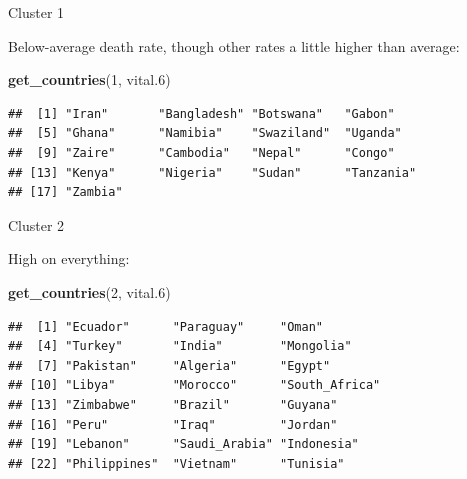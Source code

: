 \documentclass[ignorenonframetext,]{beamer}
\newenvironment{Shaded}{\begin{snugshade}}{\end{snugshade}}
\newcommand{\DecValTok}[1]{\textcolor[rgb]{0.00,0.00,0.81}{#1}}
\newcommand{\FloatTok}[1]{\textcolor[rgb]{0.00,0.00,0.81}{#1}}
\newcommand{\KeywordTok}[1]{\textcolor[rgb]{0.13,0.29,0.53}{\textbf{#1}}}
\newcommand{\NormalTok}[1]{#1}
\begin{document}
\begin{frame}[fragile]{Cluster 1}
\protect\hypertarget{cluster-1-1}{}

Below-average death rate, though other rates a little higher than
average:

\begin{Shaded}
\begin{Highlighting}[]
\KeywordTok{get_countries}\NormalTok{(}\DecValTok{1}\NormalTok{, vital}\FloatTok{.6}\NormalTok{)}
\end{Highlighting}
\end{Shaded}

\begin{verbatim}
##  [1] "Iran"       "Bangladesh" "Botswana"   "Gabon"     
##  [5] "Ghana"      "Namibia"    "Swaziland"  "Uganda"    
##  [9] "Zaire"      "Cambodia"   "Nepal"      "Congo"     
## [13] "Kenya"      "Nigeria"    "Sudan"      "Tanzania"  
## [17] "Zambia"
\end{verbatim}

\end{frame}

\begin{frame}[fragile]{Cluster 2}
\protect\hypertarget{cluster-2}{}

High on everything:

\normalsize

\begin{Shaded}
\begin{Highlighting}[]
\KeywordTok{get_countries}\NormalTok{(}\DecValTok{2}\NormalTok{, vital}\FloatTok{.6}\NormalTok{)}
\end{Highlighting}
\end{Shaded}

\begin{verbatim}
##  [1] "Ecuador"      "Paraguay"     "Oman"        
##  [4] "Turkey"       "India"        "Mongolia"    
##  [7] "Pakistan"     "Algeria"      "Egypt"       
## [10] "Libya"        "Morocco"      "South_Africa"
## [13] "Zimbabwe"     "Brazil"       "Guyana"      
## [16] "Peru"         "Iraq"         "Jordan"      
## [19] "Lebanon"      "Saudi_Arabia" "Indonesia"   
## [22] "Philippines"  "Vietnam"      "Tunisia"
\end{verbatim}

\normalsize

\end{frame}
\end{document}
